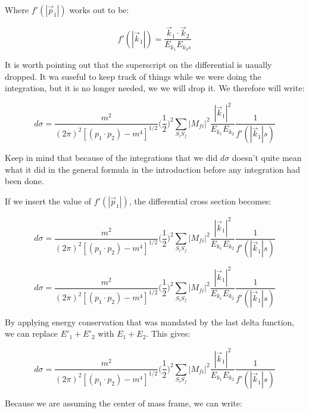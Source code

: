 \documentclass[a4]{article}
\begin{document}
    Where $f' (|\vec{p}_1|)$ works out to be:

    \begin{equation}
        f' (|\vec{k}_1|) = \frac{\vec{k}_1 \cdot \vec{k}_2}{E_{k_1} E_{k_2s}}
    \end{equation}

    It is worth pointing out that the superscript on the differential is uaually dropped. It wa suseful to keep track of things while we were doing the integration, but it is no longer needed, we we will drop it. 
    We therefore will write: 

    \begin{equation}
        d \sigma = \frac{m^2}{(2 \pi)^2 [(p_1 \cdot p_2) - m^4]^{1/2}} \bigg( \frac{1}{2} \bigg)^2 \sum_{S_i S_f} |M_{fi}|^2 \frac{|\vec{k}_1|^2}{E_{k_1} E_{k_2}} \frac{1}{f' (|\vec{k}_1|s)}
    \end{equation}

    Keep in mind that because of the integrations that we did $d \sigma$ doesn't quite mean what it did in the general formula in the introduction before any  integration had been done.

    If we insert the value of $f' (|\vec{p}_1|)$, the differential cross section becomes:

    \begin{equation}
        d \sigma = \frac{m^2}{(2 \pi)^2 [(p_1 \cdot p_2) - m^4]^{1/2}} \bigg( \frac{1}{2} \bigg)^2 \sum_{S_i S_f} |M_{fi}|^2 \frac{|\vec{k}_1|^2}{E_{k_1} E_{k_2}} \frac{1}{f' (|\vec{k}_1|s)}
    \end{equation}

    \begin{equation}
        d \sigma = \frac{m^2}{(2 \pi)^2 [(p_1 \cdot p_2) - m^4]^{1/2}} \bigg( \frac{1}{2} \bigg)^2 \sum_{S_i S_f} |M_{fi}|^2 \frac{|\vec{k}_1|^2}{E_{k_1} E_{k_2}} \frac{1}{f' (|\vec{k}_1|s)}
    \end{equation}

    By applying energy conservation that was mandated by the last delta function, we can replace $E'_1 + E'_2$ with $E_1 + E_2$. This gives:

    \begin{equation}
        d \sigma = \frac{m^2}{(2 \pi)^2 [(p_1 \cdot p_2) - m^4]^{1/2}} \bigg( \frac{1}{2} \bigg)^2 \sum_{S_i S_f} |M_{fi}|^2 \frac{|\vec{k}_1|^2}{E_{k_1} E_{k_2}} \frac{1}{f' (|\vec{k}_1|s)}
    \end{equation}

    Because we are assuming the center of mass frame, we can write:
\end{document}
